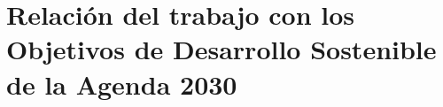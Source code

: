 %
\chapter{Relación del trabajo con los Objetivos de Desarrollo Sostenible de la Agenda 2030}
\label{anexo:ods}

\providecommand{\ods}{X}

